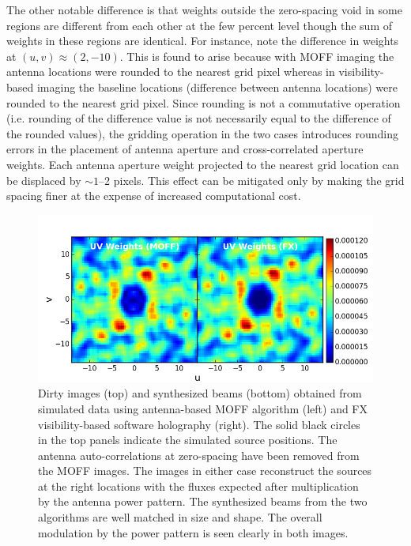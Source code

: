 \documentclass[a4paper,fleqn,usenatbib]{../mnras}
\begin{document}
The other notable difference is that weights outside the zero-spacing void in
some regions are different from each other at the few percent level though the 
sum of weights in these regions are identical. For instance, note the 
difference in weights at $(u,v)\approx (2,-10)$. This is found to arise 
because with MOFF imaging the antenna locations were rounded to the nearest 
grid pixel whereas in visibility-based imaging the baseline locations 
(difference between antenna locations) were rounded to the nearest grid pixel. 
Since rounding is not a commutative operation (i.e. rounding of the difference 
value is not necessarily equal to the difference of the rounded values), the 
gridding operation in the two cases introduces rounding errors in the placement 
of antenna aperture and cross-correlated aperture weights. Each antenna 
aperture weight projected to the nearest grid location can be displaced by 
$\sim 1$--2 pixels. This effect can be mitigated only by making the grid 
spacing finer at the expense of increased computational cost. 

\begin{figure}
  \includegraphics[width=\columnwidth]{MOFF_FX_comparison_uvwts_test_aperture_zero_spacing_removed.png}
  \caption{Dirty images (top) and synthesized beams (bottom) obtained from 
    simulated data using antenna-based MOFF algorithm (left) and FX 
    visibility-based software holography (right). The solid black circles in the
    top panels indicate the simulated source positions. The antenna 
    auto-correlations at zero-spacing have been removed from the MOFF images. 
    The images in either case reconstruct the sources at the right locations 
    with the fluxes expected after multiplication by the antenna power pattern. 
    The synthesized beams from the two algorithms are well matched in size and
    shape. The overall modulation by the power pattern is seen clearly in both
    images.}
  \label{fig:MOFF-FX-uvwts}
\end{figure}
\end{document}
